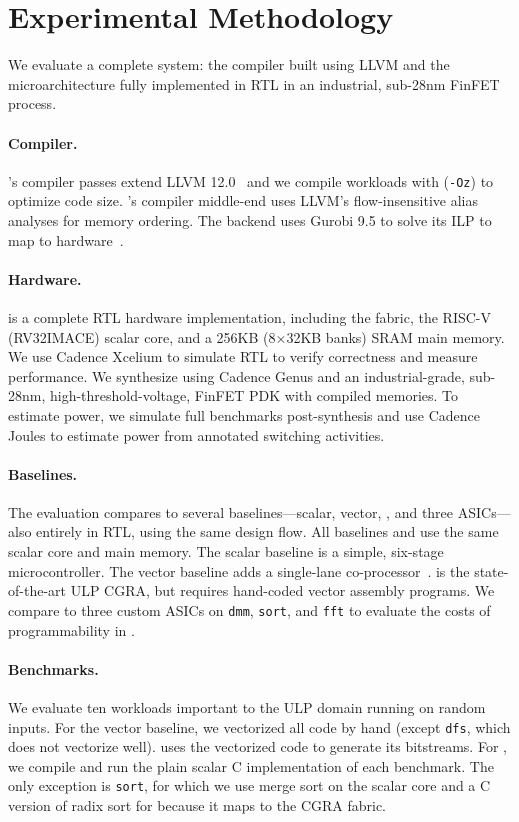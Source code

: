 \section{Experimental Methodology}
\label{riptide:method}

We evaluate a complete \riptide system: the compiler built using LLVM and the
microarchitecture fully implemented in RTL in an industrial, sub-28nm FinFET process.

\paragraph{Compiler.}
\riptide's compiler passes extend LLVM 12.0~\cite{llvm} and we compile workloads with
(\texttt{-Oz}) to optimize code size.  \riptide's compiler middle-end uses LLVM's
flow-insensitive alias analyses for memory ordering.
%
The backend uses Gurobi 9.5 to solve its ILP to map
to hardware~\cite{gurobi}.

\paragraph{Hardware.}
\riptide is a complete RTL hardware implementation, including the \riptide fabric, the RISC-V
(RV32IMACE) scalar core, and a 256KB (8$\times$32KB banks) SRAM main memory. 
% 
We use Cadence Xcelium to simulate RTL to verify correctness and measure
performance.
% 
We synthesize \riptide using Cadence Genus and an industrial-grade, sub-28nm,
high-threshold-voltage, FinFET PDK with compiled memories.
% 
To estimate power, we simulate full benchmarks post-synthesis and use Cadence
Joules to estimate power from annotated switching activities.

\paragraph{Baselines.}
The evaluation compares to several baselines---scalar, vector, \snafu, and
three ASICs---also entirely in RTL, using the same design
flow.
% 
All baselines and \riptide use the same scalar core and main memory.
% 
The scalar baseline is a simple, six-stage microcontroller.
% 
The vector baseline adds a single-lane co-processor~\cite{manic}.
% 
\snafu is the state-of-the-art ULP CGRA, but requires 
hand-coded vector assembly programs.
% 
We compare to three custom ASICs on {\tt dmm}, {\tt sort}, and {\tt fft} to evaluate the costs of
programmability in \riptide.

\paragraph{Benchmarks.}
We evaluate ten workloads important to the ULP domain running on random inputs.
% 
For the vector baseline, we vectorized all code by hand (except {\tt dfs}, which does not 
vectorize well).
% 
\snafu uses the vectorized code to generate its bitstreams.
% 
For \riptide, we compile and run the plain scalar C implementation of each benchmark. 
%
The only exception is {\tt sort}, for which we use merge sort on the scalar core and
a C version of radix sort for \riptide because it maps to the CGRA fabric.
% 
